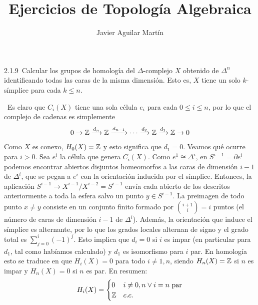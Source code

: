 \documentclass[twoside]{article}
\begin{document}
\title{Ejercicios de Topología Algebraica}
\author{Javier Aguilar Martín}
\maketitle

\begin{ejercicio}{2.1.9}\
Calcular los grupos de homología del $\Delta$-complejo $X$ obtenido de $\Delta^n$ identificando todas las caras de la misma dimensión. Esto es, $X$ tiene un solo $k$-símplice para cada $k\leq n$. 

 

\end{ejercicio}
\begin{solucion}\
Es claro que $C_i(X)$ tiene una sola célula $e_i$ para cada $0\leq i\leq n$, por lo que el complejo de cadenas es simplemente
\[
0\to \mathbb{Z}\xrightarrow{d_n}\mathbb{Z}\xrightarrow{d_{n-1}}\cdots \xrightarrow{d_2}\mathbb{Z}\xrightarrow{d_1}\mathbb{Z}\to 0
\]
Como $X$ es conexo, $H_0(X)=\mathbb{Z}$ y esto significa que $d_1=0$. Veamos qué ocurre para $i>0$. Sea $e^i$ la célula que genera $C_i(X)$. Como $e^1\cong\Delta^i$, en $S^{i-1}=\partial e^i$ podemos encontrar abiertos disjuntos homeomorfos a las caras de dimensión $i-1$ de $\Delta^i$, que se pegan a $e^i$ con la orientación inducida por el símplice. Entonces, la aplicación $S^{i-1}\to X^{i-1}/X^{i-2}=S^{i-1}$ envía cada abierto de los descritos anteriormente a toda la esfera salvo un punto $y\in S^{i-1}$. La preimagen de todo punto $x\neq y$ consiste en un conjunto finito formado por $\binom{i+1}{i}=i$ puntos (el número de caras de dimensión $i-1$ de $\Delta^i$). Además, la orientación que induce el símplice es alternante, por lo que los grados locales alternan de signo y el grado total es $\sum_{j=0}^i(-1)^j$. Esto implica que $d_i=0$ si $i$ es impar (en particular para $d_1$, tal como habíamos calculado) y $d_1$ es isomorfismo para $i$ par. En homología esto se traduce en que $H_i(X)=0$ para todo $i\neq 1,n$, siendo $H_n(X)=\mathbb{Z}$ si $n$ es impar y $H_n(X)=0$ si $n$ es par. En resumen:
\[
H_i(X)=\begin{cases}
0 & i\neq 0,n\lor i=n \text{ par}\\
\mathbb{Z} & c.c.
\end{cases}
\]
\end{solucion}

\newpage
\end{document}
